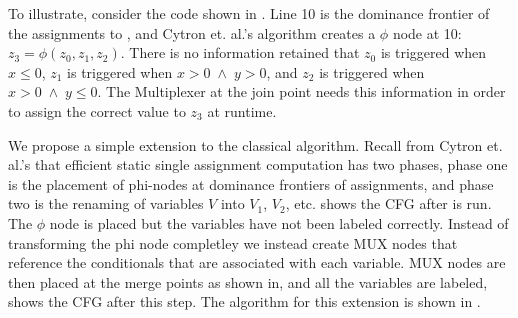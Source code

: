 To illustrate, consider the code shown in .
Line 10 is the dominance frontier of the assignments to 
\z, and Cytron et. al.'s algorithm creates a $\phi$ node at 10: $z_3 = \phi(z_0, z_1, z_2)$. 
There is no information retained that $z_0$ is triggered when $x \le 0$, $z_1$ is triggered when 
$x > 0 \; \wedge \; y > 0$, and $z_2$ is triggered when $x > 0 \; \wedge \; y \le 0$. The Multiplexer at the join point
needs this information in order to assign the correct value to $z_3$ at runtime.

We propose a simple extension to the classical algorithm. Recall from Cytron et. al.'s 
that efficient static single assignment computation has two phases, phase one is the 
placement of phi-nodes at dominance frontiers of assignments, and phase two is the 
renaming of variables $V$ into $V_1$, $V_2$, etc. 
shows the CFG after  is run. The $\phi$ node is placed but the 
variables have not been labeled correctly. Instead of transforming the phi node completley
we instead create MUX nodes that reference the conditionals that are associated with each variable.
MUX nodes are then placed at the merge points as shown in, and all the variables are labeled,
 shows the CFG after this step. The algorithm for this 
extension is shown in . 


